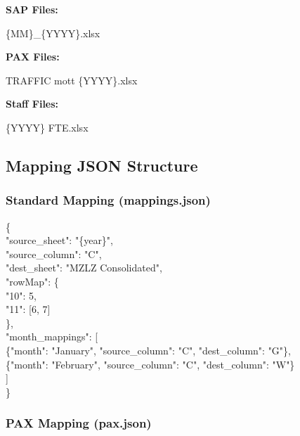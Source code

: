 \documentclass[11pt,a4paper]{article}
\begin{document}
\textbf{SAP Files:}

\begin{codebox}
\{MM\}\_\{YYYY\}.xlsx
\end{codebox}

\textbf{PAX Files:}

\begin{codebox}
TRAFFIC mott \{YYYY\}.xlsx
\end{codebox}

\textbf{Staff Files:}

\begin{codebox}
\{YYYY\} FTE.xlsx
\end{codebox}

\subsection{Mapping JSON Structure}

\subsubsection{Standard Mapping (mappings.json)}

\begin{codebox}
\{\\
\quad "source\_sheet": "\{year\}",\\
\quad "source\_column": "C",\\
\quad "dest\_sheet": "MZLZ Consolidated",\\
\quad "rowMap": \{\\
\quad\quad "10": 5,\\
\quad\quad "11": [6, 7]\\
\quad \},\\
\quad "month\_mappings": [\\
\quad\quad \{"month": "January", "source\_column": "C", "dest\_column": "G"\},\\
\quad\quad \{"month": "February", "source\_column": "C", "dest\_column": "W"\}\\
\quad ]\\
\}
\end{codebox}

\subsubsection{PAX Mapping (pax.json)}
\end{document}
